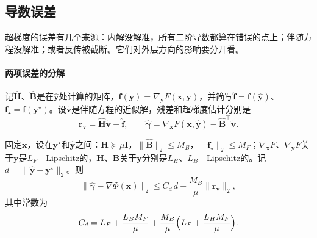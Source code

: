 \subsection{导数误差}
\label{sec:bilevel-derivative-error}

超梯度的误差有几个来源：内解没解准，所有二阶导数都算在错误的点上；伴随方程没解准；或者反传被截断。它们对外层方向的影响要分开看。

\paragraph{两项误差的分解}
记$\hat{\bm{H}}$、$\hat{\bm{B}}$是在$\hat{\bm{y}}$处计算的矩阵，$\bm{f}(\bm{y})=\nabla_{\bm{y}}F(\bm{x},\bm{y})$，并简写$\hat{\bm{f}}=\bm{f}(\hat{\bm{y}})$、$\bm{f}_\star=\bm{f}(\bm{y}^\star)$。设$\tilde{\bm{v}}$是伴随方程的近似解，残差和超梯度估计分别是
\begin{equation}
 \bm{r}_{\bm{v}}=\hat{\bm{H}}\tilde{\bm{v}}-\hat{\bm{f}},\qquad\hat{\bm{\gamma}}=\nabla_{\bm{x}}F(\bm{x},\hat{\bm{y}})-\hat{\bm{B}}^{\top}\tilde{\bm{v}}.
 \label{eq:bilevel-hypergradient-estimate}
\end{equation}

\begin{theorem}[超梯度误差的分解]
\label{thm:bilevel-hypergradient-error}
固定$\bm{x}$，设在$\bm{y}^\star$和$\hat{\bm{y}}$之间：$\bm{H}\succeq\mu\bm{I}$，$\lVert\hat{\bm{B}}\rVert_2\leq M_B$，$\lVert\bm{f}_\star\rVert_2\leq M_F$；$\nabla_{\bm{x}}F$、$\nabla_{\bm{y}}F$关于$\bm{y}$是$L_F$—Lipschitz的，$\bm{H}$、$\bm{B}$关于$\bm{y}$分别是$L_H$、$L_B$—Lipschitz的。记$d=\lVert\hat{\bm{y}}-\bm{y}^\star\rVert_2$。则
\begin{equation}
 \lVert\hat{\bm{\gamma}}-\nabla\Phi(\bm{x})\rVert_2\leq C_d\,d+\frac{M_B}{\mu}\lVert\bm{r}_{\bm{v}}\rVert_2,
 \label{eq:bilevel-hypergradient-error}
\end{equation}
其中常数为
\begin{equation}
 C_d=L_F+\frac{L_BM_F}{\mu}+\frac{M_B}{\mu}\Bigl(L_F+\frac{L_HM_F}{\mu}\Bigr).
 \label{eq:bilevel-hypergradient-constant}
\end{equation}
\end{theorem}

